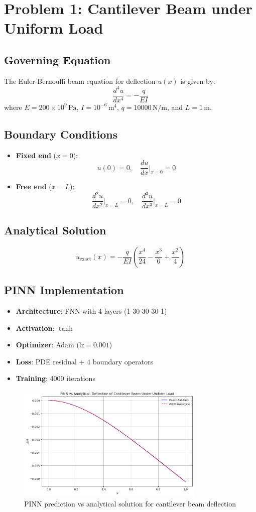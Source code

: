 \documentclass{article}
\begin{document}
\section*{Problem 1: Cantilever Beam under Uniform Load}

\subsection*{Governing Equation}
The Euler-Bernoulli beam equation for deflection \( u(x) \) is given by:
\[
\frac{d^4 u}{dx^4} = -\frac{q}{EI}
\]
where \( E = 200 \times 10^9 \, \text{Pa} \), \( I = 10^{-6} \, \text{m}^4 \), \( q = 10000 \, \text{N/m} \), and \( L = 1 \, \text{m} \).

\subsection*{Boundary Conditions}
\begin{itemize}
    \item \textbf{Fixed end} (\( x = 0 \)):
        \[
        u(0) = 0, \quad \frac{du}{dx}\Big|_{x=0} = 0
        \]
    \item \textbf{Free end} (\( x = L \)):
        \[
        \frac{d^2u}{dx^2}\Big|_{x=L} = 0, \quad \frac{d^3u}{dx^3}\Big|_{x=L} = 0
        \]
\end{itemize}

\subsection*{Analytical Solution}
\[
u_{\text{exact}}(x) = -\frac{q}{EI} \left( \frac{x^4}{24} - \frac{x^3}{6} + \frac{x^2}{4} \right)
\]

\subsection*{PINN Implementation}
\begin{itemize}
    \item \textbf{Architecture}: FNN with 4 layers (1-30-30-30-1)
    \item \textbf{Activation}: \(\tanh\)
    \item \textbf{Optimizer}: Adam (\( \text{lr} = 0.001 \))
    \item \textbf{Loss}: PDE residual + 4 boundary operators
    \item \textbf{Training}: 4000 iterations
\end{itemize}

\begin{figure}[H]
    \centering
    \includegraphics[width=0.8\textwidth]{geom1.png}
    \caption{PINN prediction vs analytical solution for cantilever beam deflection}
    \label{fig:cantilever}
\end{figure}
\end{document}

